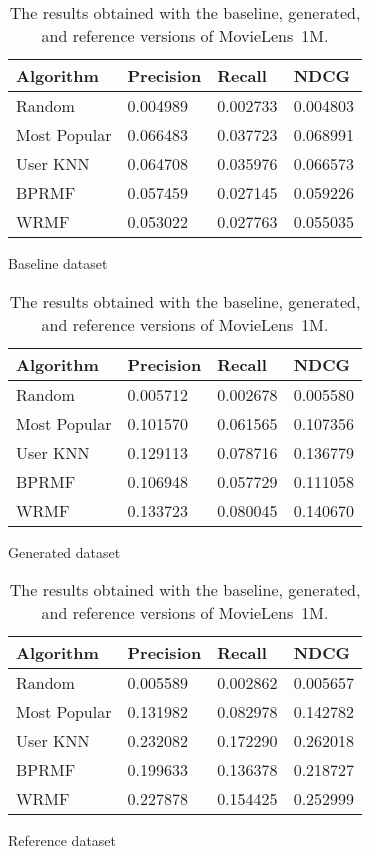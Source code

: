 \begin{table}
\begin{subfigure}{\textwidth}
\centering
\begin{tabular}{@{}llll@{}}
\toprule
Algorithm & Precision & Recall & NDCG \\ \midrule
Random & 0.004989 & 0.002733 & 0.004803 \\
Most Popular & 0.066483 & 0.037723 & 0.068991 \\
User KNN & 0.064708 & 0.035976 & 0.066573 \\
BPRMF & 0.057459 & 0.027145 & 0.059226 \\
WRMF & 0.053022 & 0.027763 & 0.055035 \\ \bottomrule
\end{tabular}
\caption{Baseline dataset}
\bigskip
\end{subfigure}
\begin{subfigure}{\textwidth}
\centering
\begin{tabular}{@{}llll@{}}
\toprule
Algorithm & Precision & Recall & NDCG \\ \midrule
Random & 0.005712 & 0.002678 & 0.005580 \\
Most Popular & 0.101570 & 0.061565 & 0.107356 \\
User KNN & 0.129113 & 0.078716 & 0.136779 \\
BPRMF & 0.106948 & 0.057729 & 0.111058 \\
WRMF & 0.133723 & 0.080045 & 0.140670 \\ \bottomrule
\end{tabular}
\caption{Generated dataset}
\bigskip
\end{subfigure}
\begin{subfigure}{\textwidth}
\centering
\begin{tabular}{@{}llll@{}}
\toprule
Algorithm & Precision & Recall & NDCG \\ \midrule
Random & 0.005589 & 0.002862 & 0.005657 \\
Most Popular & 0.131982 & 0.082978 & 0.142782 \\
User KNN & 0.232082 & 0.172290 & 0.262018 \\
BPRMF & 0.199633 & 0.136378 & 0.218727 \\
WRMF & 0.227878 & 0.154425 & 0.252999 \\ \bottomrule
\end{tabular}
\caption{Reference dataset}
\end{subfigure}
\caption[Experimental results with the synthetic MovieLens~1M]{The results obtained with the baseline, generated, and reference versions of MovieLens~1M.}
\label{syn:tab:movielens-1m}
\end{table}

